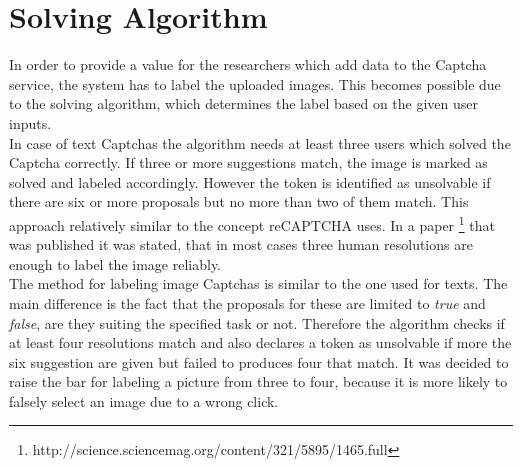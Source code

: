 \section{Solving Algorithm}
\label{sec:solving_algorithm}

In order to provide a value for the researchers which add data to the Captcha service, the system has to label the uploaded images. This becomes possible due to the solving algorithm, which determines the label based on the given user inputs. \\
In case of text Captchas the algorithm needs at least three users which solved the Captcha correctly. If three or more suggestions match, the image is marked as solved and labeled accordingly. However the token is identified as unsolvable if there are six or more proposals but no more than two of them match. This approach relatively similar to the concept reCAPTCHA uses. In a paper \footnote{http://science.sciencemag.org/content/321/5895/1465.full} that was published it was stated, that in most cases three human resolutions are enough to label the image reliably. \\
The method for labeling image Captchas is similar to the one used for texts. The main difference is the fact that the proposals for these are limited to \textit{true} and \textit{false}, are they suiting the specified task or not. Therefore the algorithm checks if at least four resolutions match and also declares a token as unsolvable if more the six suggestion are given but failed to produces four that match. It was decided to raise the bar for labeling a picture from three to four, because it is more likely to falsely select an image due to a wrong click.